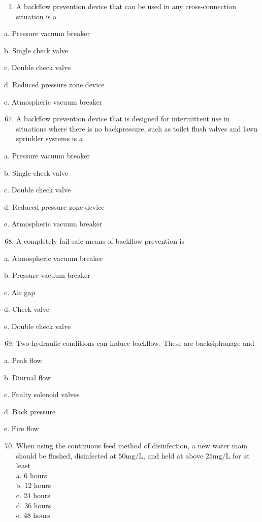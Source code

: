 \documentclass[10pt]{article}
\begin{document}
\begin{enumerate}
\begin{enumerate}
\begin{enumerate}
  \item A backflow prevention device that can be used in any cross-connection situation is a

\end{enumerate}

a. Pressure vacuum breaker

b. Single check valve

c. Double check valve

d. Reduced pressure zone device

e. Atmospheric vacuum breaker

\begin{enumerate}
  \setcounter{enumi}{66}
  \item A backflow prevention device that is designed for intermittent use in situations where there is no backpressure, such as toilet flush valves and lawn sprinkler systems is a
\end{enumerate}

a. Pressure vacuum breaker

b. Single check valve

c. Double check valve

d. Reduced pressure zone device

e. Atmospheric vacuum breaker

\begin{enumerate}
  \setcounter{enumi}{67}
  \item A completely fail-safe means of backflow prevention is
\end{enumerate}

a. Atmospheric vacuum breaker

b. Pressure vacuum breaker

c. Air gap

d. Check valve

e. Double check valve

\begin{enumerate}
  \setcounter{enumi}{68}
  \item Two hydraulic conditions can induce backflow. These are backsiphonage and
\end{enumerate}

a. Peak flow

b. Diurnal flow

c. Faulty solenoid valves

d. Back pressure

e. Fire flow

\begin{enumerate}
  \setcounter{enumi}{69}
  \item When using the continuous feed method of disinfection, a new water main should be flushed, disinfected at $50 \mathrm{mg} / \mathrm{L}$, and held at above $25 \mathrm{mg} / \mathrm{L}$ for at least\\
a. 6 hours\\
b. 12 hours\\
c. 24 hours\\
d. 36 hours\\
e. 48 hours\\


\end{enumerate}
\end{enumerate}
\end{enumerate}
\end{document}
